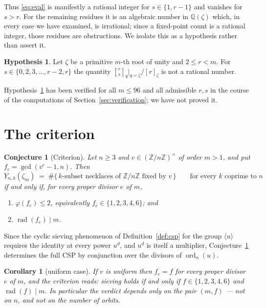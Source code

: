 \documentclass[11pt,a4paper]{article}
\theoremstyle{plain}
\newtheorem{corollary}[theorem]{Corollary}
\newtheorem{conjecture}[theorem]{Conjecture}
\theoremstyle{definition}
\newtheorem{hypothesis}[theorem]{Hypothesis}
\theoremstyle{remark}
\newcommand{\Z}{\mathbb{Z}}
\newcommand{\Q}{\mathbb{Q}}
\newcommand{\Zn}{\Z/n\Z}
\newcommand{\units}[1]{(\Z/#1\Z)^{\times}}
\newcommand{\qbin}[2]{\genfrac[]{0pt}{}{#1}{#2}_{q}}
\newcommand{\rad}{\operatorname{rad}}
\newcommand{\ord}{\operatorname{ord}}
\newcommand{\CSP}{\textup{CSP}}
\begin{document}
Thus \eqref{eq:eval} is manifestly a rational integer for $s\in\{1,r-1\}$ and vanishes for
$s>r$. For the remaining residues it is an algebraic number in $\Q(\zeta)$ which, in every
case we have examined, is irrational; since a fixed-point count is a rational integer, those
residues are obstructions. We isolate this as a hypothesis rather than assert it.

\begin{hypothesis}\label{hyp:bad}
Let $\zeta$ be a primitive $m$-th root of unity and $2\le r<m$. For
$s\in\{0,2,3,\dots,r-2,r\}$ the quantity $\qbin{r}{s}\big|_{q=\zeta}\big/[r]_\zeta$ is not a
rational number.
\end{hypothesis}

Hypothesis~\ref{hyp:bad} has been verified for all $m\le 96$ and all admissible $r,s$ in the
course of the computations of Section~\ref{sec:verification}; we have not proved it.

\section{The criterion}\label{sec:criterion}

\begin{conjecture}[Criterion]\label{conj:main}
Let $n\ge3$ and $v\in\units{n}$ of order $m>1$, and put $f_e=\gcd(v^e-1,n)$. Then
\[
  Y_{n,k}(\zeta_m)\;=\;\#\{\,k\text{-subset necklaces of }\Zn\text{ fixed by }v\,\}
  \qquad\text{for every }k\text{ coprime to }n
\]
if and only if, for every proper divisor $e$ of $m$,
\begin{enumerate}
  \item[\textup{(i)}] $\varphi(f_e)\le 2$, equivalently $f_e\in\{1,2,3,4,6\}$; and
  \item[\textup{(ii)}] $\rad(f_e)\mid m$.
\end{enumerate}
\end{conjecture}

Since the cyclic sieving phenomenon of Definition~\ref{def:csp} for the group
$\langle u\rangle$ requires the identity at every power $u^{d}$, and $u^{d}$ is itself a
multiplier, Conjecture~\ref{conj:main} determines the full \CSP{} by conjunction over the
divisors of $\ord_n(u)$.

\begin{corollary}[uniform case]\label{cor:uniform}
If $v$ is uniform then $f_e=f$ for every proper divisor $e$ of $m$, and the criterion reads:
sieving holds if and only if $f\in\{1,2,3,4,6\}$ and $\rad(f)\mid m$. In particular the
verdict depends only on the pair $(m,f)$ --- not on $n$, and not on the number of orbits.
\end{corollary}
\end{document}
